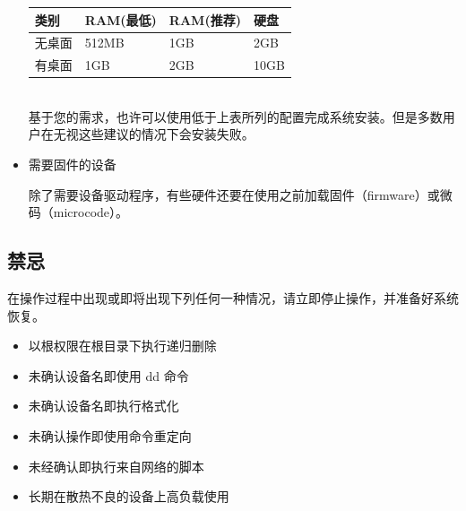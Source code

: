 \documentclass{article}
\begin{document}
\begin{multicols*}{3}
\begin{itemize}[leftmargin=*]
		{\small\begin{tabularx}{\linewidth}{|X|X|X|X|}
			\hline
			类别 & RAM\newline (最低) & RAM\newline (推荐) & 硬盘 \\
			\hline
			无桌面 & 512MB & 1GB & 2GB \\
			\hline
			有桌面 & 1GB & 2GB & 10GB \\
			\hline
		\end{tabularx}}
		\\
		基于您的需求，也许可以使用低于上表所列的配置完成系统安装。但是多数用户在无视这些建议的情况下会安装失败。

		\item 需要固件的设备

		除了需要设备驱动程序，有些硬件还要在使用之前加载固件（firmware）或微码（microcode）。

	\end{itemize}


	\begin{tcolorbox}
	\section*{禁忌}
	\end{tcolorbox}

	在操作过程中出现或即将出现下列任何一种情况，请立即停止操作，并准备好系统恢复。

	\begin{itemize}[leftmargin=*]
		\setlength{\itemsep}{0pt}
		\setlength{\parskip}{0pt}
		\setlength{\parsep}{0pt}

		\item 以根权限在根目录下执行递归删除
		\item 未确认设备名即使用 dd 命令
		\item 未确认设备名即执行格式化
		\item 未确认操作即使用命令重定向
		\item 未经确认即执行来自网络的脚本
		\item 长期在散热不良的设备上高负载使用
	\end{itemize}




\end{multicols*}
\end{document}
